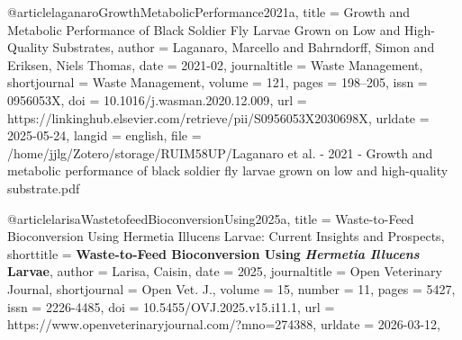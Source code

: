 {{{{@article{laganaroGrowthMetabolicPerformance2021a,
  title = {Growth and Metabolic Performance of Black Soldier Fly Larvae Grown on Low and High-Quality Substrates},
  author = {Laganaro, Marcello and Bahrndorff, Simon and Eriksen, Niels Thomas},
  date = {2021-02},
  journaltitle = {Waste Management},
  shortjournal = {Waste Management},
  volume = {121},
  pages = {198--205},
  issn = {0956053X},
  doi = {10.1016/j.wasman.2020.12.009},
  url = {https://linkinghub.elsevier.com/retrieve/pii/S0956053X2030698X},
  urldate = {2025-05-24},
  langid = {english},
  file = {/home/jjlg/Zotero/storage/RUIM58UP/Laganaro et al. - 2021 - Growth and metabolic performance of black soldier fly larvae grown on low and high-quality substrate.pdf}
}

@article{larisaWastetofeedBioconversionUsing2025a,
  title = {Waste-to-Feed Bioconversion Using {{Hermetia}} Illucens {{Larvae}}: {{Current}} Insights and Prospects},
  shorttitle = {\textbf{Waste-to-Feed Bioconversion Using }{{\textbf{\mkbibemph{Hermetia}}}}\textbf{\mkbibemph{ Illucens}}\textbf{ }{{\textbf{Larvae}}}},
  author = {Larisa, Caisin},
  date = {2025},
  journaltitle = {Open Veterinary Journal},
  shortjournal = {Open Vet. J.},
  volume = {15},
  number = {11},
  pages = {5427},
  issn = {2226-4485},
  doi = {10.5455/OVJ.2025.v15.i11.1},
  url = {https://www.openveterinaryjournal.com/?mno=274388},
  urldate = {2026-03-12},
}}}}}
